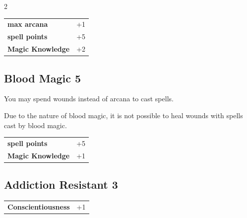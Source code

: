 \begin{multicols}{2}
\begin{tcolorbox}
\begin{tabular}{@{}ll@{}}
    \textbf{max arcana} & +1\\
    \textbf{spell points} & +5\\
    \textbf{Magic Knowledge} & +2\\
\end{tabular}


\end{tcolorbox}

\begin{tcolorbox}
    \subsection*{Blood Magic \hfill \small{5 }}
    \tcblower
You may spend wounds instead of arcana to cast spells.

Due to the nature of blood magic, it is not possible to heal wounds with spells cast by blood magic.


\vspace{3mm}

\begin{tabular}{@{}ll@{}}
    \textbf{spell points} & +5\\
    \textbf{Magic Knowledge} & +1\\
\end{tabular}


\end{tcolorbox}

\begin{tcolorbox}
    \subsection*{Addiction Resistant \hfill \small{3 }}
    \tcblower




\begin{tabular}{@{}ll@{}}
    \textbf{Conscientiousness} & +1\\
\end{tabular}



\end{tcolorbox}
\end{multicols}
